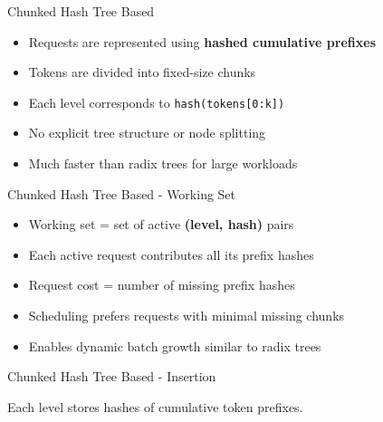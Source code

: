 \documentclass[Serif, 10pt, brown]{beamer}
\theoremstyle{example}
\theoremstyle{plain}
\begin{document}
\begin{frame}{Chunked Hash Tree Based}
\begin{itemize}
    \item Requests are represented using \textbf{hashed cumulative prefixes}
    \item Tokens are divided into fixed-size chunks
    \item Each level corresponds to \texttt{hash(tokens[0:k])}
    \item No explicit tree structure or node splitting
    \item Much faster than radix trees for large workloads
\end{itemize}
\end{frame}

\begin{frame}{Chunked Hash Tree Based - Working Set}
\begin{itemize}
    \item Working set = set of active \textbf{(level, hash)} pairs
    \item Each active request contributes all its prefix hashes
    \item Request cost = number of missing prefix hashes
    \item Scheduling prefers requests with minimal missing chunks
    \item Enables dynamic batch growth similar to radix trees
\end{itemize}
\end{frame}

\begin{frame}{Chunked Hash Tree Based - Insertion}
\centering
{}
\vspace{0.5em}
\small
Each level stores hashes of cumulative token prefixes.
\end{frame}
\end{document}
